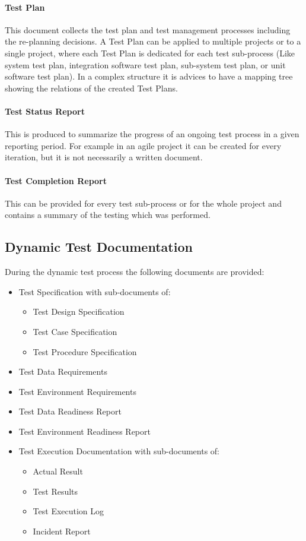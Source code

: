 \paragraph{Test Plan}
This document collects the test plan and test management processes including the re-planning decisions. A Test Plan can be applied to multiple projects or to a single project, where each Test Plan is dedicated for each test sub-process (Like system test plan, integration software test plan, sub-system test plan, or unit software test plan). In a complex structure it is advices to have a mapping tree showing the relations of the created Test Plans.

\paragraph{Test Status Report}
This is produced to summarize the progress of an ongoing test process in a given reporting period. For example in an agile project it can be created for every iteration, but it is not necessarily a written document.

\paragraph{Test Completion Report}
This can be provided for every test sub-process or for the whole project and contains a summary of the testing which was performed.

\subsection{Dynamic Test Documentation}
During the dynamic test process the following documents are provided:
\begin{itemize}
	\item Test Specification with sub-documents of:
	\begin{itemize}
		\item Test Design Specification
		\item Test Case Specification
		\item Test Procedure Specification
	\end{itemize}
	\item Test Data Requirements
	\item Test Environment Requirements
	\item Test Data Readiness Report
	\item Test Environment Readiness Report
	\item Test Execution Documentation with sub-documents of:
	\begin{itemize}
		\item Actual Result
		\item Test Results
		\item Test Execution Log
		\item Incident Report
	\end{itemize}
\end{itemize}

